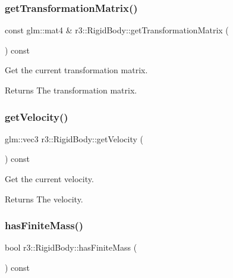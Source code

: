 \subsubsection{\texorpdfstring{get\+Transformation\+Matrix()}{getTransformationMatrix()}}
{\footnotesize\ttfamily const glm\+::mat4 \& r3\+::\+Rigid\+Body\+::get\+Transformation\+Matrix (\begin{DoxyParamCaption}{ }\end{DoxyParamCaption}) const}



Get the current transformation matrix. 

\begin{DoxyReturn}{Returns}
The transformation matrix. 
\end{DoxyReturn}
\mbox{\label{classr3_1_1_rigid_body_a17b3c0a13865cdca6e43037ec7107d58}} 
\subsubsection{\texorpdfstring{get\+Velocity()}{getVelocity()}}
{\footnotesize\ttfamily glm\+::vec3 r3\+::\+Rigid\+Body\+::get\+Velocity (\begin{DoxyParamCaption}{ }\end{DoxyParamCaption}) const}



Get the current velocity. 

\begin{DoxyReturn}{Returns}
The velocity. 
\end{DoxyReturn}
\mbox{\label{classr3_1_1_rigid_body_a4e2a5b4dd423c75199fb0a4fb2ae078f}} 
\subsubsection{\texorpdfstring{has\+Finite\+Mass()}{hasFiniteMass()}}
{\footnotesize\ttfamily bool r3\+::\+Rigid\+Body\+::has\+Finite\+Mass (\begin{DoxyParamCaption}{ }\end{DoxyParamCaption}) const}



